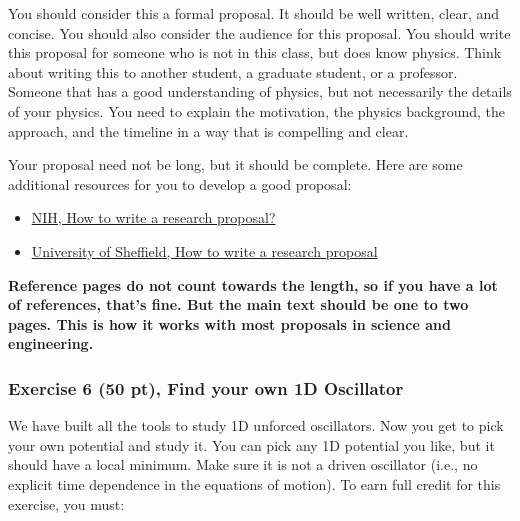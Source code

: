 \documentclass[11pt]{article}
\providecommand{\tightlist}{%
      \setlength{\itemsep}{0pt}\setlength{\parskip}{0pt}}
\begin{document}
You should consider this a formal proposal. It should be well written,
clear, and concise. You should also consider the audience for this
proposal. You should write this proposal for someone who is not in this
class, but does know physics. Think about writing this to another
student, a graduate student, or a professor. Someone that has a good
understanding of physics, but not necessarily the details of your
physics. You need to explain the motivation, the physics background, the
approach, and the timeline in a way that is compelling and clear.

Your proposal need not be long, but it should be complete. Here are some
additional resources for you to develop a good proposal:

\begin{itemize}
\tightlist
\item
  \href{https://pmc.ncbi.nlm.nih.gov/articles/PMC5037942/}{NIH, How to
  write a research proposal?}
\item
  \href{https://www.sheffield.ac.uk/study-skills/research/methods/proposal}{University
  of Sheffield, How to write a research proposal}
\end{itemize}

\textbf{Reference pages do not count towards the length, so if you have
a lot of references, that's fine. But the main text should be one to two
pages. This is how it works with most proposals in science and
engineering.}

    \subsubsection{Exercise 6 (50 pt), Find your own 1D
Oscillator}\label{exercise-6-50-pt-find-your-own-1d-oscillator}

We have built all the tools to study 1D unforced oscillators. Now you
get to pick your own potential and study it. You can pick any 1D
potential you like, but it should have a local minimum. Make sure it is
not a driven oscillator (i.e., no explicit time dependence in the
equations of motion). To earn full credit for this exercise, you must:
\end{document}
